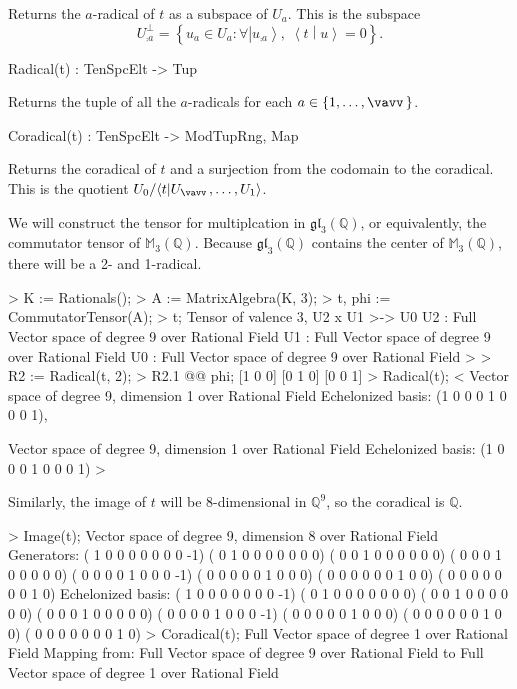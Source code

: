 Returns the $a$-radical of $t$ as a subspace of $U_a$. 
This is the subspace 
\[ U_{\comp{a}}^\perp = \left\{ u_a \in U_a : \forall \left| u_{\comp{a}}\right\rangle,\; \left\langle t \middle| u\right\rangle =0\right\}. \] 

\begin{intrinsics}
Radical(t) : TenSpcElt -> Tup
\end{intrinsics}

Returns the tuple of all the $a$-radicals for each $a\in \{1,\dots,\vav\}$.

\begin{intrinsics}
Coradical(t) : TenSpcElt -> ModTupRng, Map
\end{intrinsics}

Returns the coradical of $t$ and a surjection from the codomain to the coradical.
This is the quotient $U_0 / \langle t | U_{\vav}, \dots, U_1\rangle$.

\begin{example}[Radicals]

We will construct the tensor for multiplcation in $\mathfrak{gl}_3(\mathbb{Q})$, or equivalently, the commutator tensor of $\mathbb{M}_3(\mathbb{Q})$.
Because $\mathfrak{gl}_3(\mathbb{Q})$ contains the center of $\mathbb{M}_3(\mathbb{Q})$, there will be a 2- and 1-radical.
\begin{code}
> K := Rationals();
> A := MatrixAlgebra(K, 3);
> t, phi := CommutatorTensor(A);
> t;
Tensor of valence 3, U2 x U1 >-> U0
U2 : Full Vector space of degree 9 over Rational Field
U1 : Full Vector space of degree 9 over Rational Field
U0 : Full Vector space of degree 9 over Rational Field
> 
> R2 := Radical(t, 2);
> R2.1 @@ phi;
[1 0 0]
[0 1 0]
[0 0 1]
> Radical(t);
<
    Vector space of degree 9, dimension 1 over Rational Field
    Echelonized basis:
    (1 0 0 0 1 0 0 0 1),

    Vector space of degree 9, dimension 1 over Rational Field
    Echelonized basis:
    (1 0 0 0 1 0 0 0 1)
>
\end{code}

Similarly, the image of $t$ will be 8-dimensional in $\mathbb{Q}^9$, so the coradical is $\mathbb{Q}$.
\begin{code}
> Image(t);
Vector space of degree 9, dimension 8 over Rational Field
Generators:
( 1  0  0  0  0  0  0  0 -1)
( 0  1  0  0  0  0  0  0  0)
( 0  0  1  0  0  0  0  0  0)
( 0  0  0  1  0  0  0  0  0)
( 0  0  0  0  1  0  0  0 -1)
( 0  0  0  0  0  1  0  0  0)
( 0  0  0  0  0  0  1  0  0)
( 0  0  0  0  0  0  0  1  0)
Echelonized basis:
( 1  0  0  0  0  0  0  0 -1)
( 0  1  0  0  0  0  0  0  0)
( 0  0  1  0  0  0  0  0  0)
( 0  0  0  1  0  0  0  0  0)
( 0  0  0  0  1  0  0  0 -1)
( 0  0  0  0  0  1  0  0  0)
( 0  0  0  0  0  0  1  0  0)
( 0  0  0  0  0  0  0  1  0)
> Coradical(t);
Full Vector space of degree 1 over Rational Field
Mapping from: Full Vector space of degree 9 over Rational Field to Full
Vector space of degree 1 over Rational Field
\end{code}
\end{example}


